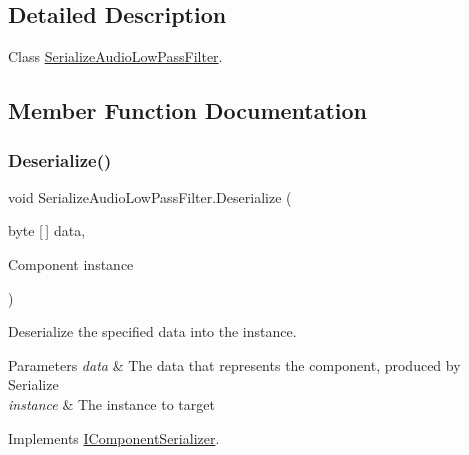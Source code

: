 \subsection{Detailed Description}
Class \hyperlink{class_serialize_audio_low_pass_filter}{Serialize\+Audio\+Low\+Pass\+Filter}. 



\subsection{Member Function Documentation}
\mbox{\label{class_serialize_audio_low_pass_filter_a041864b6e0b1f1a8bab893b5243ad880}} 
\subsubsection{\texorpdfstring{Deserialize()}{Deserialize()}}
{\footnotesize\ttfamily void Serialize\+Audio\+Low\+Pass\+Filter.\+Deserialize (\begin{DoxyParamCaption}\item[{byte \mbox{[}$\,$\mbox{]}}]{data,  }\item[{Component}]{instance }\end{DoxyParamCaption})\hspace{0.3cm}{\ttfamily [inline]}}



Deserialize the specified data into the instance. 


\begin{DoxyParams}{Parameters}
{\em data} & The data that represents the component, produced by Serialize\\
\hline
{\em instance} & The instance to target\\
\hline
\end{DoxyParams}


Implements \hyperlink{interface_i_component_serializer_a4cc366a5c78b33d47a90c209d8fed883}{I\+Component\+Serializer}.

\mbox{\label{class_serialize_audio_low_pass_filter_a3c3f8b730af67936ec7ddc4f318bd1c0}} 

